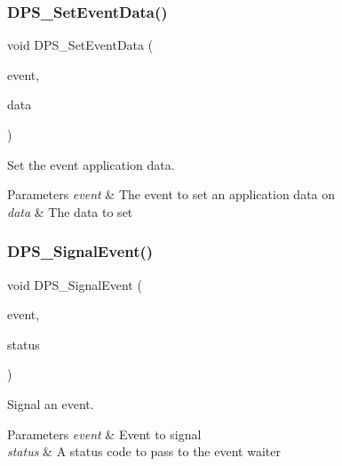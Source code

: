 \subsubsection{\texorpdfstring{D\+P\+S\+\_\+\+Set\+Event\+Data()}{DPS\_SetEventData()}}
{\footnotesize\ttfamily void D\+P\+S\+\_\+\+Set\+Event\+Data (\begin{DoxyParamCaption}\item[{\hyperlink{group__event_ga97617da1bac0e76646713b8665dfdd85}{D\+P\+S\+\_\+\+Event} $\ast$}]{event,  }\item[{void $\ast$}]{data }\end{DoxyParamCaption})}



Set the event application data. 


\begin{DoxyParams}{Parameters}
{\em event} & The event to set an application data on \\
\hline
{\em data} & The data to set \\
\hline
\end{DoxyParams}
\mbox{\label{group__event_gad0f8a3b372f972bfaa97e29fa01b5c82}} 
\subsubsection{\texorpdfstring{D\+P\+S\+\_\+\+Signal\+Event()}{DPS\_SignalEvent()}}
{\footnotesize\ttfamily void D\+P\+S\+\_\+\+Signal\+Event (\begin{DoxyParamCaption}\item[{\hyperlink{group__event_ga97617da1bac0e76646713b8665dfdd85}{D\+P\+S\+\_\+\+Event} $\ast$}]{event,  }\item[{\hyperlink{group__status_ga30395a84d3cad9d4ec29848106415038}{D\+P\+S\+\_\+\+Status}}]{status }\end{DoxyParamCaption})}



Signal an event. 


\begin{DoxyParams}{Parameters}
{\em event} & Event to signal \\
\hline
{\em status} & A status code to pass to the event waiter \\
\hline
\end{DoxyParams}
\mbox{\label{group__event_gacf62ac4adc9f8eaf088cdec6c273e930}} 
